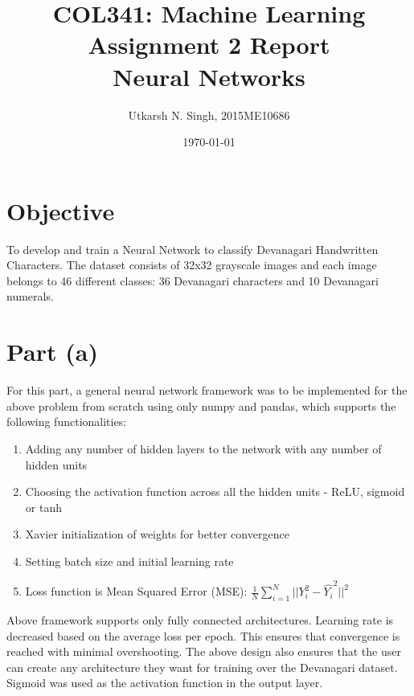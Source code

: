 \documentclass[a4paper]{article}
\title{COL341: Machine Learning \\ \LARGE{Assignment 2 Report} \\ \Large{Neural Networks}}
\author{Utkarsh N. Singh, 2015ME10686}
\date{\today}
\begin{document}
\maketitle

\section*{Objective}
To develop and train a Neural Network to classify Devanagari Handwritten Characters. The dataset consists of 32x32 grayscale images and each image belongs to 46 different classes: 36 Devanagari characters and 10 Devanagari numerals. 

\section*{Part (a)}
For this part, a general neural network framework was to be implemented for the above problem from scratch using only numpy and pandas, which supports the following functionalities:
\begin{enumerate}
	\item Adding any number of hidden layers to the network with any number of hidden units
    \item Choosing the activation function across all the hidden units - ReLU, sigmoid or tanh
    \item Xavier initialization of weights for better convergence
    \item Setting batch size and initial learning rate
    \item Loss function is Mean Squared Error (MSE): $\frac{1}{N}\sum_{i=1}^{N} ||Y_i^2-\hat{Y_i}^2||^2$
\end{enumerate}
Above framework supports only fully connected architectures. Learning rate is decreased based on the average loss per epoch. This ensures that convergence is reached with minimal overshooting. The above design also ensures that the user can create any architecture they want for training over the Devanagari dataset.
\newline
\newline
\noindent Sigmoid was used as the activation function in the output layer.
\end{document}
